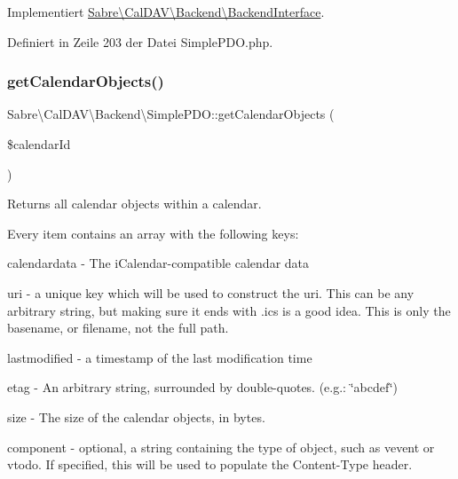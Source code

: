 Implementiert \mbox{\hyperlink{interface_sabre_1_1_cal_d_a_v_1_1_backend_1_1_backend_interface_a8c082fae6a4008fc9c2fa43ae61b9833}{Sabre\textbackslash{}\+Cal\+D\+A\+V\textbackslash{}\+Backend\textbackslash{}\+Backend\+Interface}}.



Definiert in Zeile 203 der Datei Simple\+P\+D\+O.\+php.

\mbox{\label{class_sabre_1_1_cal_d_a_v_1_1_backend_1_1_simple_p_d_o_a11bae2bb246b02189eb896efbf3a1454}} 
\subsubsection{\texorpdfstring{get\+Calendar\+Objects()}{getCalendarObjects()}}
{\footnotesize\ttfamily Sabre\textbackslash{}\+Cal\+D\+A\+V\textbackslash{}\+Backend\textbackslash{}\+Simple\+P\+D\+O\+::get\+Calendar\+Objects (\begin{DoxyParamCaption}\item[{}]{\$calendar\+Id }\end{DoxyParamCaption})}

Returns all calendar objects within a calendar.

Every item contains an array with the following keys\+:
\begin{DoxyItemize}
\item calendardata -\/ The i\+Calendar-\/compatible calendar data
\item uri -\/ a unique key which will be used to construct the uri. This can be any arbitrary string, but making sure it ends with \textquotesingle{}.ics\textquotesingle{} is a good idea. This is only the basename, or filename, not the full path.
\item lastmodified -\/ a timestamp of the last modification time
\item etag -\/ An arbitrary string, surrounded by double-\/quotes. (e.\+g.\+: \textquotesingle{} \char`\"{}abcdef\char`\"{}\textquotesingle{})
\item size -\/ The size of the calendar objects, in bytes.
\item component -\/ optional, a string containing the type of object, such as \textquotesingle{}vevent\textquotesingle{} or \textquotesingle{}vtodo\textquotesingle{}. If specified, this will be used to populate the Content-\/\+Type header.
\end{DoxyItemize}

